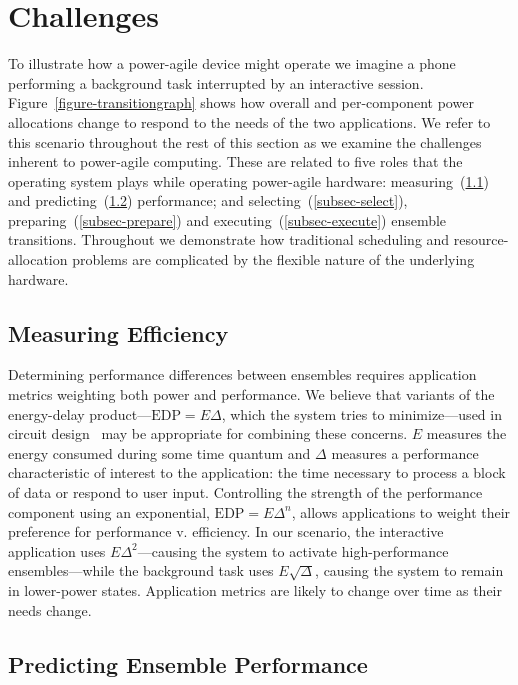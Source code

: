 \section{Challenges}
\label{sec-challenges}



To illustrate how a power-agile device might operate we imagine a phone
performing a background task interrupted by an interactive session.
Figure~\ref{figure-transitiongraph} shows how overall and per-component power
allocations change to respond to the needs of the two applications. We refer
to this scenario throughout the rest of this section as we examine the
challenges inherent to power-agile computing. These are related to five roles
that the operating system plays while operating power-agile hardware:
measuring~(\ref{subsec-measure}) and predicting~(\ref{subsec-predict})
performance; and selecting~(\ref{subsec-select}),
preparing~(\ref{subsec-prepare}) and executing~(\ref{subsec-execute})
ensemble transitions. Throughout we demonstrate how traditional scheduling
and resource-allocation problems are complicated by the flexible nature of
the underlying hardware.

\subsection{Measuring Efficiency}
\label{subsec-measure}

Determining performance differences between ensembles requires application
metrics weighting both power and performance. We believe that variants of the
energy-delay product---$\textrm{EDP} = E\Delta$, which the system tries to
minimize---used in circuit design~\cite{martin-et2} may be appropriate for
combining these concerns. $E$ measures the energy consumed during some time
quantum and $\Delta$ measures a performance characteristic of interest to the
application: the time necessary to process a block of data or respond to user
input. Controlling the strength of the performance component using an
exponential, $\textrm{EDP} = E\Delta^n$, allows applications to weight their
preference for performance v. efficiency. In our scenario, the interactive
application uses $E\Delta^2$---causing the system to activate
high-performance ensembles---while the background task uses $E\sqrt{\Delta}$,
causing the system to remain in lower-power states. Application metrics are
likely to change over time as their needs change.

\subsection{Predicting Ensemble Performance}
\label{subsec-predict}

